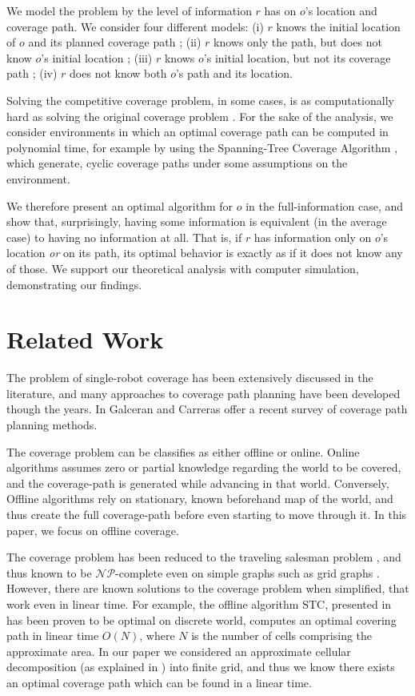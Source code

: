 \documentclass[a4paper,10pt]{article}
\newcommand\rob{\ensuremath{r}\xspace}
\newcommand\opp{\ensuremath{o}\xspace}
\begin{document}
We model the problem by the level of information \rob has on \opp's location and coverage path. We consider four different models: (i) \rob knows the initial location of \opp and its planned coverage path ; (ii) \rob knows only the path, but does not know \opp's initial location ; (iii) \rob knows \opp's initial location, but not its coverage path ; (iv) \rob does not know both \opp's path and its location.

Solving the competitive coverage problem, in some cases, is as computationally hard as solving the original coverage problem \cite{arkin2000approximation}. For the sake of the analysis, we consider environments in which an optimal coverage path can be computed in polynomial time, for example by using the Spanning-Tree Coverage Algorithm \cite{gabriely2001spanning}, which generate, cyclic coverage paths under some assumptions on the environment. 

We therefore present an optimal algorithm for \opp in the full-information case, and show that, surprisingly, having some information is equivalent (in the average case) to having no information at all. That is, if \rob has information only on \opp's location {\em or} on its path, its optimal behavior is exactly as if it does not know any of those. We support our theoretical analysis with computer simulation, demonstrating our findings. 

\section{Related Work}

The problem of single-robot coverage has been extensively discussed in the literature, and many approaches to coverage path planning have been developed though the years. In \cite{galceran2013survey} Galceran and Carreras offer a recent survey of coverage path planning methods.

The coverage problem can be classifies as either offline or online. 
Online algorithms assumes zero or partial knowledge regarding the world to be covered, and the coverage-path is generated while advancing in that world. Conversely, Offline algorithms rely on stationary, known beforehand map of the world, and thus create the full coverage-path before even starting to move through it. In this paper, we focus on offline coverage.

The coverage problem has been reduced to the traveling salesman problem \cite{arkin2000approximation}, and thus known to be $\mathcal{NP}$-complete even on simple graphs such as grid graphs \cite{papadimitriou1977euclidean}. However, there are known solutions to the coverage problem when simplified, that work even in linear time. For example, the offline algorithm STC, presented in \cite{gabriely2001spanning} has been proven to be optimal on discrete world, computes an optimal covering path in linear time $O(N)$, where $N$ is the number of cells comprising the approximate area. In our paper we considered an approximate cellular decomposition (as explained in \cite{galceran2013survey}) into finite grid, and thus we know there exists an optimal coverage path which can be found in a linear time.
\end{document}
